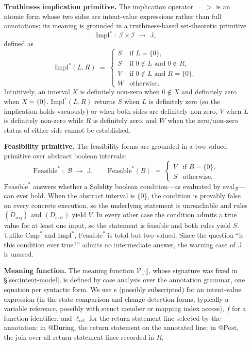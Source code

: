 \documentclass[pdflatex,sn-basic]{sn-jnl}%
\theoremstyle{thmstyleone}%
\theoremstyle{thmstyletwo}%
\theoremstyle{thmstylethree}%
\begin{document}
\smallskip
\noindent\textbf{Truthiness implication primitive.}
The implication operator ${=}{>}$ is an atomic form whose two sides are intent-value expressions rather than full annotations; its meaning is grounded in a truthiness-based set-theoretic primitive
\[
\text{Impl}^* \;:\; \mathcal{I} \times \mathcal{I} \;\to\; \mathbb{J},
\]
defined as
\[
\text{Impl}^*(L, R) \;=\;
\begin{cases}
S & \text{if } L = \{0\}, \\[2pt]
S & \text{if } 0 \notin L \text{ and } 0 \notin R, \\[2pt]
V & \text{if } 0 \notin L \text{ and } R = \{0\}, \\[2pt]
W & \text{otherwise.}
\end{cases}
\]
Intuitively, an interval $X$ is definitely non-zero when $0 \notin X$ and definitely zero when $X = \{0\}$.
$\text{Impl}^*(L, R)$ returns $S$ when $L$ is definitely zero (so the implication holds vacuously) or when both sides are definitely non-zero, $V$ when $L$ is definitely non-zero while $R$ is definitely zero, and $W$ when the zero/non-zero status of either side cannot be established.

\smallskip
\noindent\textbf{Feasibility primitive.}
The feasibility forms are grounded in a two-valued primitive over abstract boolean intervals:
\[
\text{Feasible}^* \;:\; \mathcal{B} \;\to\; \mathbb{J}, \qquad
\text{Feasible}^*(B) \;=\;
\begin{cases}
V & \text{if } B = \{0\}, \\
S & \text{otherwise.}
\end{cases}
\]
$\text{Feasible}^*$ answers whether a Solidity boolean condition---as evaluated by $\text{eval}_{\mathcal{B}}$---can ever hold.
When the abstract interval is $\{0\}$, the condition is provably false on every concrete execution, so the underlying statement is unreachable and rules $(D_{\text{req}})$ and $(D_{\text{asrt}})$ yield $V$.
In every other case the condition admits a true value for at least one input, so the statement is feasible and both rules yield $S$.
Unlike $\text{Cmp}^*$ and $\text{Impl}^*$, $\text{Feasible}^*$ is total but two-valued.
Since the question ``is this condition ever true?'' admits no intermediate answer, the warning case of $\mathbb{J}$ is unused.

\smallskip
\noindent\textbf{Meaning function.}
The meaning function $\mathcal{V}\llbracket \cdot \rrbracket$, whose signature was fixed in §\ref{sec:intent-model}, is defined by case analysis over the annotation grammar, one equation per syntactic form.
We use $e$ (possibly subscripted) for an intent-value expression (in the state-comparison and change-detection forms, typically a variable reference, possibly with struct member or mapping index access), $f$ for a function identifier, and $\ell_{\text{ret}}$ for the return-statement line selected by the annotation: in @During, the return statement on the annotated line; in @Post, the join over all return-statement lines recorded in $R$.
\end{document}
